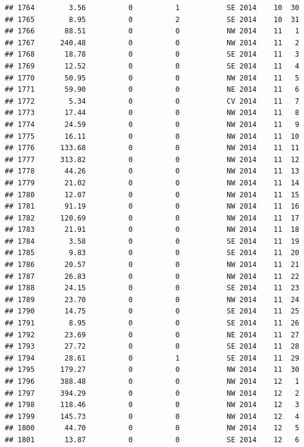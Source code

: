 \documentclass[
]{article}
\begin{document}
\begin{verbatim}
## 1764        3.56          0          1           SE 2014    10  30
## 1765        8.95          0          2           SE 2014    10  31
## 1766       88.51          0          0           NW 2014    11   1
## 1767      240.48          0          0           NW 2014    11   2
## 1768       18.78          0          0           SE 2014    11   3
## 1769       12.52          0          0           SE 2014    11   4
## 1770       50.95          0          0           NW 2014    11   5
## 1771       59.90          0          0           NE 2014    11   6
## 1772        5.34          0          0           CV 2014    11   7
## 1773       17.44          0          0           NW 2014    11   8
## 1774       24.59          0          0           NW 2014    11   9
## 1775       16.11          0          0           NW 2014    11  10
## 1776      133.68          0          0           NW 2014    11  11
## 1777      313.82          0          0           NW 2014    11  12
## 1778       44.26          0          0           NW 2014    11  13
## 1779       21.02          0          0           NW 2014    11  14
## 1780       12.07          0          0           NW 2014    11  15
## 1781       91.19          0          0           NW 2014    11  16
## 1782      120.69          0          0           NW 2014    11  17
## 1783       21.91          0          0           NW 2014    11  18
## 1784        3.58          0          0           SE 2014    11  19
## 1785        9.83          0          0           SE 2014    11  20
## 1786       20.57          0          0           NW 2014    11  21
## 1787       26.83          0          0           NW 2014    11  22
## 1788       24.15          0          0           SE 2014    11  23
## 1789       23.70          0          0           NW 2014    11  24
## 1790       14.75          0          0           SE 2014    11  25
## 1791        8.95          0          0           SE 2014    11  26
## 1792       23.69          0          0           NE 2014    11  27
## 1793       27.72          0          0           SE 2014    11  28
## 1794       28.61          0          1           SE 2014    11  29
## 1795      179.27          0          0           NW 2014    11  30
## 1796      388.48          0          0           NW 2014    12   1
## 1797      394.29          0          0           NW 2014    12   2
## 1798      118.46          0          0           NW 2014    12   3
## 1799      145.73          0          0           NW 2014    12   4
## 1800       44.70          0          0           NW 2014    12   5
## 1801       13.87          0          0           SE 2014    12   6

\end{verbatim}
\end{document}
